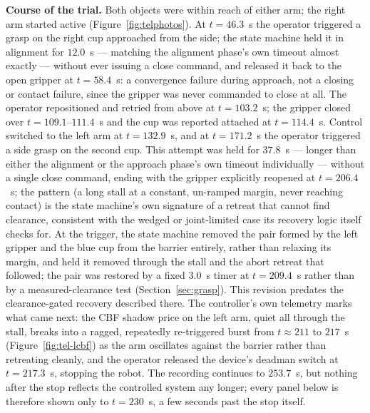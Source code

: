 \documentclass[12pt,a4paper,twoside,openright]{report}
\begin{document}
\textbf{Course of the trial.} Both objects were within reach of either arm; the right arm started active (Figure~\ref{fig:telphotos}). At $t=46.3$~s the operator triggered a grasp on the right cup approached from the side; the state machine held it in alignment for $12.0$~s --- matching the alignment phase's own timeout almost exactly --- without ever issuing a close command, and released it back to the open gripper at $t=58.4$~s: a convergence failure during approach, not a closing or contact failure, since the gripper was never commanded to close at all. The operator repositioned and retried from above at $t=103.2$~s; the gripper closed over $t=109.1$--$111.4$~s and the cup was reported attached at $t=114.4$~s. Control switched to the left arm at $t=132.9$~s, and at $t=171.2$~s the operator triggered a side grasp on the second cup. This attempt was held for $37.8$~s --- longer than either the alignment or the approach phase's own timeout individually --- without a single close command, ending with the gripper explicitly reopened at $t=206.4$~s; the pattern (a long stall at a constant, un-ramped margin, never reaching contact) is the state machine's own signature of a retreat that cannot find clearance, consistent with the wedged or joint-limited case its recovery logic itself checks for. At the trigger, the state machine removed the pair formed by the left gripper and the blue cup from the barrier entirely, rather than relaxing its margin, and held it removed through the stall and the abort retreat that followed; the pair was restored by a fixed $3.0$~s timer at $t=209.4$~s rather than by a measured-clearance test (Section~\ref{sec:grasp}). This revision predates the clearance-gated recovery described there. The controller's own telemetry marks what came next: the CBF shadow price on the left arm, quiet all through the stall, breaks into a ragged, repeatedly re-triggered burst from $t\approx211$ to $217$~s (Figure~\ref{fig:tel-lcbf}) as the arm oscillates against the barrier rather than retreating cleanly, and the operator released the device's deadman switch at $t=217.3$~s, stopping the robot. The recording continues to $253.7$~s, but nothing after the stop reflects the controlled system any longer; every panel below is therefore shown only to $t=230$~s, a few seconds past the stop itself.
\end{document}
